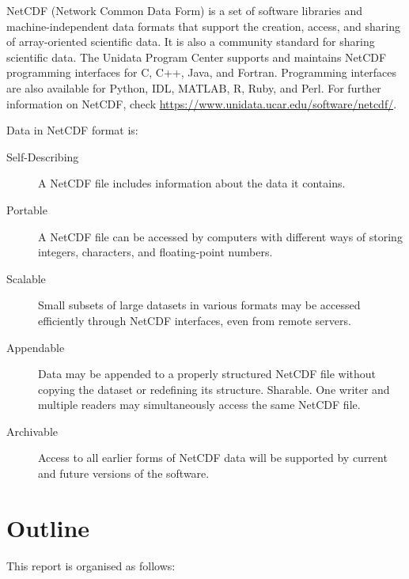 NetCDF (Network Common Data Form) is a set of software libraries and machine-independent data formats that support the creation, access, and sharing of array-oriented scientific data. It is also a community standard for sharing scientific data. The Unidata Program Center supports and maintains NetCDF programming interfaces for C, C++, Java, and Fortran. Programming interfaces are also available for Python, IDL, MATLAB, R, Ruby, and Perl. For further information on NetCDF, check \url{https://www.unidata.ucar.edu/software/netcdf/}.

Data in NetCDF format is:

\begin{description}

\item[Self-Describing] A NetCDF file includes information about the data it contains.

\item[Portable] A NetCDF file can be accessed by computers with different ways of storing integers, characters, and floating-point numbers.

\item[Scalable] Small subsets of large datasets in various formats may be accessed efficiently through NetCDF interfaces, even from remote servers.

\item[Appendable] Data may be appended to a properly structured NetCDF file without copying the dataset or redefining its structure.
Sharable. One writer and multiple readers may simultaneously access the same NetCDF file.

\item[Archivable] Access to all earlier forms of NetCDF data will be supported by current and future versions of the software.

\end{description}

\section{Outline}

This report is organised as follows:

